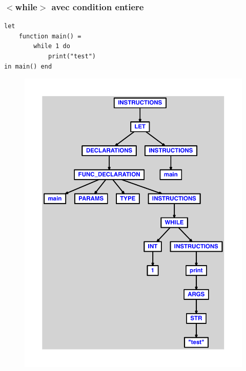 \documentclass{article}
\begin{document}
\subsubsection{$ < $while$ > $ avec condition entiere}
\begin{lstlisting}
let
	function main() =
		while 1 do
			print("test")
in main() end
\end{lstlisting}
\newpage
\begin{figure}[H]
\centering
\includegraphics[max width=\textwidth]{ast/ast_335.pdf}
\end{figure}
\newpage
\end{document}
